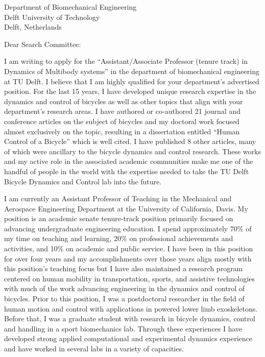 \documentclass{letter}
\date{}
\begin{document}
\begin{letter}{
  Department of Biomechanical Engineering \\
  Delft University of Technology \\
  Delft, Netherlands
}

\opening{Dear Search Committee:}

I am writing to apply for the ``Assistant/Associate Professor (tenure track) in
Dynamics of Multibody systems'' in the department of biomechanical engineering
at TU Delft. I believe that I am highly qualified for your department's
advertised position.  For the last 15 years, I have developed unique research
expertise in the dynamics and control of bicycles as well as other topics that
align with your department's research areas. I have authored or co-authored 21
journal and conference articles on the subject of bicycles and my doctoral work
focused almost exclusively on the topic, resulting in a dissertation entitled
``Human Control of a Bicycle'' which is well cited. I have published 8 other
articles, many of which were ancillary to the bicycle dynamics and control
research. These works and my active role in the associated academic communities
make me one of the handful of people in the world with the expertise needed to
take the TU Delft Bicycle Dynamics and Control lab into the future.

I am currently an Assistant Professor of Teaching in the Mechanical and
Aerospace Engineering Department at the University of California, Davis. My
position is an academic senate tenure-track position primarily focused on
advancing undergraduate engineering education. I spend approximately 70\% of my
time on teaching and learning, 20\% on professional achievements and
activities, and 10\% on academic and public service. I have been in this
position for over four years and my accomplishments over those years align
mostly with this position's teaching focus but I have also maintained a
research program centered on human mobility in transportation, sports, and
assistive technologies with much of the work advancing engineering in the
dynamics and control of bicycles. Prior to this position, I was a postdoctoral
researcher in the field of human motion and control with applications in
powered lower limb exoskeletons. Before that, I was a graduate student with
research in bicycle dynamics, control and handling in a sport biomechanics lab.
Through these experiences I have developed strong applied computational and
experimental dynamics experience and have worked in several labs in a variety
of capacities.


\end{letter}
\end{document}
